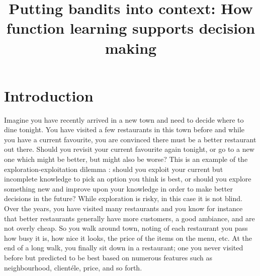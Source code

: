 \documentclass[a4paper,natbib]{apa6}
\title{Putting bandits into context: How function learning supports decision making}
\begin{document}
\maketitle

\section{Introduction}

Imagine you have recently arrived in a new town and need to decide where to dine tonight. You have visited a few restaurants in this town before and while you have a current favourite, you are convinced there must be a better restaurant out there. Should you revisit your current favourite again tonight, or go to a new one which might be better, but might also be worse? This is an example of the exploration-exploitation dilemma \citep[e.g.,][]{Cohen2007,laureiro2010neuroscientific,mehlhorn2015unpacking}: should you exploit your current but incomplete knowledge to pick an option you think is best, or should you explore something new and improve upon your knowledge in order to make better decisions in the future? While exploration is risky, in this case it is not blind. Over the years, you have visited many restaurants and you know for instance that better restaurants generally have more customers, a good ambiance, and are not overly cheap. So you walk around town, noting of each restaurant you pass how busy it is, how nice it looks, the price of the items on the menu, etc. At the end of a long walk, you finally sit down in a restaurant; one you never visited before but predicted to be best based on numerous features such as neighbourhood, client\'ele, price, and so forth.
\end{document}
